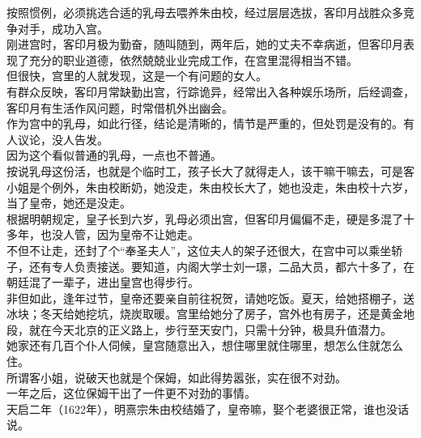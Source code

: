 \begin{multicols}{\theparacolNo}
按照惯例，必须挑选合适的乳母去喂养朱由校，经过层层选拔，客印月战胜众多竞争对手，成功入宫。\\

刚进宫时，客印月极为勤奋，随叫随到，两年后，她的丈夫不幸病逝，但客印月表现了充分的职业道德，依然兢兢业业完成工作，在宫里混得相当不错。\\

但很快，宫里的人就发现，这是一个有问题的女人。\\

有群众反映，客印月常缺勤出宫，行踪诡异，经常出入各种娱乐场所，后经调查，客印月有生活作风问题，时常借机外出幽会。\\

作为宫中的乳母，如此行径，结论是清晰的，情节是严重的，但处罚是没有的。有人议论，没人告发。\\

因为这个看似普通的乳母，一点也不普通。\\

按说乳母这份活，也就是个临时工，孩子长大了就得走人，该干嘛干嘛去，可是客小姐是个例外，朱由校断奶，她没走，朱由校长大了，她也没走，朱由校十六岁，当了皇帝，她还是没走。\\

根据明朝规定，皇子长到六岁，乳母必须出宫，但客印月偏偏不走，硬是多混了十多年，也没人管，因为皇帝不让她走。\\

不但不让走，还封了个“奉圣夫人”，这位夫人的架子还很大，在宫中可以乘坐轿子，还有专人负责接送。要知道，内阁大学士刘一璟，二品大员，都六十多了，在朝廷混了一辈子，进出皇宫也得步行。\\

非但如此，逢年过节，皇帝还要亲自前往祝贺，请她吃饭。夏天，给她搭棚子，送冰块；冬天给她挖坑，烧炭取暖。宫里给她分了房子，宫外也有房子，还是黄金地段，就在今天北京的正义路上，步行至天安门，只需十分钟，极具升值潜力。\\

她家还有几百个仆人伺候，皇宫随意出入，想住哪里就住哪里，想怎么住就怎么住。\\

所谓客小姐，说破天也就是个保姆，如此得势嚣张，实在很不对劲。\\

一年之后，这位保姆干出了一件更不对劲的事情。\\

天启二年（1622年），明熹宗朱由校结婚了，皇帝嘛，娶个老婆很正常，谁也没话说。\\


\end{multicols}
